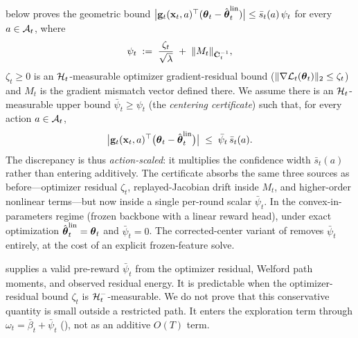 \begin{assumption}\label{asm:optim}
 below proves the geometric bound
$\bigl|\mathbf{g}_t(\mathbf{x}_t,a)^\top(\boldsymbol{\theta}_t-\hat{\boldsymbol{\theta}}_t^{\mathrm{lin}})\bigr|
\le\bar s_t(a)\,\psi_t$ for every $a\in\mathcal{A}_t$, where
\begin{equation}\label{eq:psi-def}
  \psi_t \;:=\; \frac{\zeta_t}{\sqrt{\lambda}}
  \;+\; \|M_t\|_{\bar{\mathbf{C}}_t^{-1}},
\end{equation}
$\zeta_t\ge0$ is an $\mathcal{H}_t$-measurable optimizer gradient-residual bound
($\|\nabla\mathcal{L}_t(\boldsymbol{\theta}_t)\|_2\le\zeta_t$) and $M_t$ is the gradient
mismatch vector defined there.
We assume there is an $\mathcal{H}_t$-measurable upper bound
$\bar\psi_t\ge\psi_t$ (the \emph{centering certificate}) such that,
for every action $a\in\mathcal{A}_t$,
\begin{equation}\label{eq:pred-stab}
  \bigl|\mathbf{g}_t(\mathbf{x}_t,a)^\top
    \bigl(\boldsymbol{\theta}_t - \hat{\boldsymbol{\theta}}_t^{\mathrm{lin}}\bigr)\bigr|
  \;\le\;
  \bar\psi_t\,\bar s_t(a).
\end{equation}
The discrepancy is thus \emph{action-scaled}: it multiplies the
confidence width $\bar s_t(a)$ rather than entering additively.  The
certificate absorbs the same three sources as before---optimizer residual
$\zeta_t$, replayed-Jacobian drift inside $M_t$, and higher-order nonlinear
terms---but now inside a single per-round scalar $\bar\psi_t$.
In the convex-in-parameters regime (frozen backbone with a linear reward
head), under exact optimization $\hat{\boldsymbol{\theta}}_t^{\mathrm{lin}}=\boldsymbol{\theta}_t$ and
$\bar\psi_t=0$.
The corrected-center variant of  removes
$\bar\psi_t$ entirely, at the cost of an explicit frozen-feature solve.
\end{assumption}

\begin{remark}
 supplies a valid pre-reward $\bar\psi_t$ from
the optimizer residual, Welford path moments, and observed residual energy.
It is predictable when the optimizer-residual bound $\zeta_t$ is
$\mathcal{H}_t^-$-measurable.
We do not prove that this conservative quantity is small outside a restricted
path.  It enters the exploration term
through $\omega_t=\bar\beta_t+\bar\psi_t$
(), not as an additive $O(T)$ term.
\end{remark}

